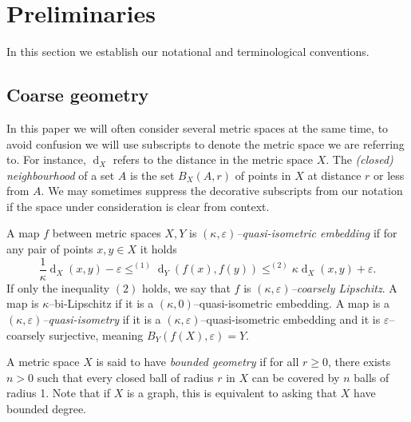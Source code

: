 \documentclass[11pt,a4paper]{amsart}
\DeclareMathOperator{\dist}{d}
\theoremstyle{definition}
\begin{document}



\section{Preliminaries}

In this section we establish our notational and terminological conventions.







\subsection{Coarse geometry}
In this paper we will often consider several metric spaces at the same time, to avoid confusion we will use subscripts to denote the metric space we are referring to. For instance, $\dist_X$ refers to the distance in the metric space $X$. The \emph{(closed) neighbourhood} of a set $A$ is the set $B_X(A, r)$ of points in $X$ at distance $r$ or less from $A$. We may sometimes suppress the decorative subscripts from our notation if the space under consideration is clear from context.

A map $f$ between metric spaces $X,Y$ is \emph{$(\kappa, \varepsilon)$--quasi-isometric embedding} if for any pair of points $x,y\in X$ it holds \[\frac{1}{\kappa} \dist_X (x,y) - \varepsilon \leq^{(1)} \dist_Y(f(x),f(y)) \leq^{(2)} \kappa \dist_X(x,y) + \varepsilon.\]
If only the inequality $(2)$ holds, we say that $f$ is \emph{$(\kappa, \varepsilon)$--coarsely Lipschitz}. A map is $\kappa$--bi-Lipschitz if it is a $(\kappa, 0)$--quasi-isometric embedding. 
A map is a \emph{$(\kappa, \varepsilon)$--quasi-isometry} if it is a $(\kappa, \varepsilon)$--quasi-isometric embedding and it is $\varepsilon$--coarsely surjective, meaning $B_Y(f(X), \varepsilon) = Y$. 



A metric space $X$ is said to have \emph{bounded geometry} if for all $r \geq 0$, there exists $n > 0$ such that every closed ball of radius $r$ in $X$ can be covered by $n$ balls of radius 1. Note that if $X$ is a graph, this is equivalent to asking that $X$ have bounded degree. 
\end{document}

